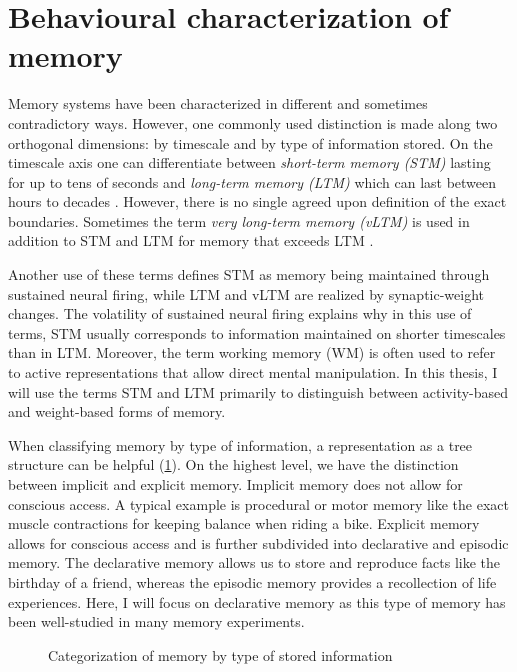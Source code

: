 \section{Behavioural characterization of memory}
Memory systems have been characterized in different and sometimes contradictory ways.
However, one commonly used distinction is made along two orthogonal dimensions:
by timescale and by type of information stored.
On the timescale axis one can differentiate between \emph{short-term memory (STM)} lasting for up to tens of seconds and \emph{long-term memory (LTM)} which can last between hours to decades \parencite{chaudhuri2016}.
However, there is no single agreed upon definition of the exact boundaries.
Sometimes the term \emph{very long-term memory (vLTM)} is used in addition to STM and LTM for memory that exceeds LTM \parencite{solso1998}.

Another use of these terms defines STM as memory being maintained through sustained neural firing, while LTM and vLTM are realized by synaptic-weight changes.
The volatility of sustained neural firing explains why in this use of terms, STM usually corresponds to information maintained on shorter timescales than in LTM\@.
Moreover, the term working memory (WM) is often used to refer to active representations that allow direct mental manipulation.
In this thesis, I will use the terms STM and LTM primarily to distinguish between activity-based and weight-based forms of memory.

When classifying memory by type of information, a representation as a tree structure can be helpful (\cref{fig:memtypes}).
On the highest level, we have the distinction between implicit and explicit memory.
Implicit memory does not allow for conscious access.
A typical example is procedural or motor memory like the exact muscle contractions for keeping balance when riding a bike.
Explicit memory allows for conscious access and is further subdivided into declarative and episodic memory.
The declarative memory allows us to store and reproduce facts like the birthday of a friend, whereas the episodic memory provides a recollection of life experiences.
Here, I will focus on declarative memory as this type of memory has been well-studied in many memory experiments.
\begin{figure}
    \centering
    \caption{Categorization of memory by type of stored 
        information}\label{fig:memtypes}
\end{figure}



